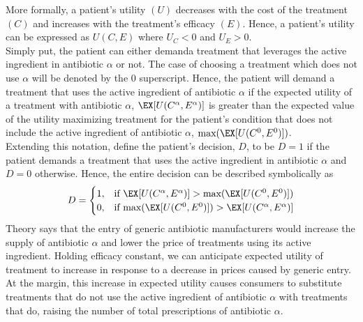 \indent More formally, a patient's utility $(U)$ decreases with the cost of the treatment $(C)$ and increases with the treatment's efficacy $(E)$. Hence, a patient's utility can be expressed as $U(C,E)$ where $U_C < 0$ and $U_E > 0$.\\
\indent Simply put, the patient can either demanda treatment that leverages the active ingredient in antibiotic $\alpha$ or not. The case of choosing a treatment which does not use $\alpha$ will be denoted by the $0$ superscript. Hence, the patient will demand a treatment that uses the active ingredient of antibiotic $\alpha$ if the expected utility of a treatment with antibiotic $\alpha$, $\EX[U(C^\alpha,E^\alpha)]$ is greater than the expected value of the utility maximizing treatment for the patient's condition that does not include the active ingredient of antibiotic $\alpha$, $\text{max}(\EX[U(C^0,E^0)])$.\\
Extending this notation, define the patient's decision, $D$, to be $D=1$ if the patient demands a treatment that uses the active ingredient in antibiotic $\alpha$ and $D=0$ otherwise. Hence, the entire decision can be described symbolically as
\begin{eqnarray}
  D =
  \begin{cases}
    1, & \text{if }\EX[U(C^\alpha,E^\alpha)] > \text{max}(\EX[U(C^0,E^0)]) \\
    0, & \text{if }\text{max}(\EX[U(C^0,E^0)]) > \EX[U(C^\alpha,E^\alpha)] \\
  \end{cases}
\end{eqnarray}
\indent Theory says that the entry of generic antibiotic manufacturers would increase the supply of antibiotic $\alpha$ and lower the price of treatments using its active ingredient. Holding efficacy constant, we can anticipate expected utility of treatment to increase in response to a decrease in prices caused by generic entry. At the margin, this increase in expected utility causes consumers to substitute treatments that do not use the active ingredient of antibiotic $\alpha$ with treatments that do, raising the number of total prescriptions of antibiotic $\alpha$.
